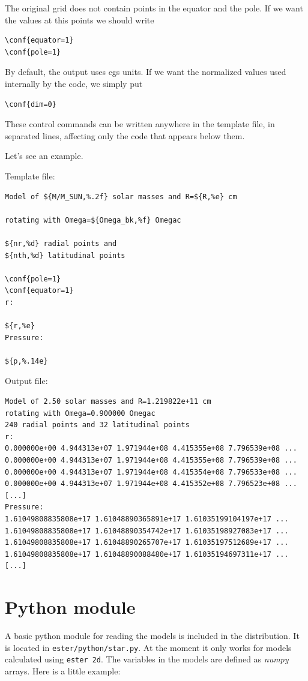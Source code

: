 The original grid  does not contain points in the equator and the pole. If we want the values
at this points we should write
\begin{verbatim}
\conf{equator=1}
\conf{pole=1}
\end{verbatim}

By default, the output uses cgs units. If we want the normalized values used internally by
the code, we simply put
\begin{verbatim}
\conf{dim=0}
\end{verbatim}

These control commands can be written anywhere in the template file, in separated lines, 
affecting only the code that appears below them.

Let's see an example.

Template file:
\begin{verbatim}
Model of ${M/M_SUN,%.2f} solar masses and R=${R,%e} cm

rotating with Omega=${Omega_bk,%f} Omegac

${nr,%d} radial points and 
${nth,%d} latitudinal points

\conf{pole=1}
\conf{equator=1}
r:

${r,%e}
Pressure:

${p,%.14e}

\end{verbatim} 

Output file:
\begin{verbatim}
Model of 2.50 solar masses and R=1.219822e+11 cm
rotating with Omega=0.900000 Omegac
240 radial points and 32 latitudinal points
r:
0.000000e+00 4.944313e+07 1.971944e+08 4.415355e+08 7.796539e+08 ...
0.000000e+00 4.944313e+07 1.971944e+08 4.415355e+08 7.796539e+08 ...
0.000000e+00 4.944313e+07 1.971944e+08 4.415354e+08 7.796533e+08 ...
0.000000e+00 4.944313e+07 1.971944e+08 4.415352e+08 7.796523e+08 ...
[...]
Pressure:
1.61049808835808e+17 1.61048890365891e+17 1.61035199104197e+17 ...
1.61049808835808e+17 1.61048890354742e+17 1.61035198927083e+17 ...
1.61049808835808e+17 1.61048890265707e+17 1.61035197512689e+17 ...
1.61049808835808e+17 1.61048890088480e+17 1.61035194697311e+17 ...
[...]
\end{verbatim} 


\section{Python module}

A basic python module for reading the models is included in the distribution. It is located
in {\tt ester/python/star.py}. At the moment it only works for models calculated using
{\tt ester 2d}. The variables in the models are defined as \emph{numpy}
arrays. Here is a little example:

